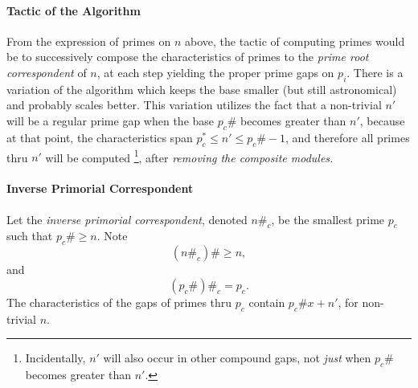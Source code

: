 \documentclass{article}
\begin{document}
\paragraph{Tactic of the Algorithm}	From the expression of primes on $n$ above, the tactic of computing primes would be to successively compose the characteristics of primes to the \emph{prime root correspondent} of $n$, at each step yielding the proper prime gaps on $p_i$. There is a variation of the algorithm which keeps the base smaller (but still astronomical) and probably scales better. This variation utilizes the fact that a non-trivial $n'$ will be a regular prime gap when the base $p_c\#$ becomes greater than $n'$, because at that point, the characteristics span $p_c^* \leq n' \leq p_c\#-1$, and therefore all primes thru $n'$ will be computed \footnote{Incidentally, $n'$ will also occur in other compound gaps, not \emph{just} when $p_c\#$ becomes greater than $n'$.}, after \emph{removing the composite modules.}

\paragraph{Inverse Primorial Correspondent}	Let the \emph{inverse primorial correspondent}, denoted $n\#_c$, be the smallest prime $p_c$ such that $p_c\# \geq n$. Note
	\begin{equation*}(n\#_c)\# \ge n,\end{equation*}
and
	\begin{equation*}(p_c\#)\#_c = p_c.\end{equation*}
The characteristics of the gaps of primes thru $p_c$ contain $p_c\#x+n'$, for non-trivial $n$.
\end{document}
